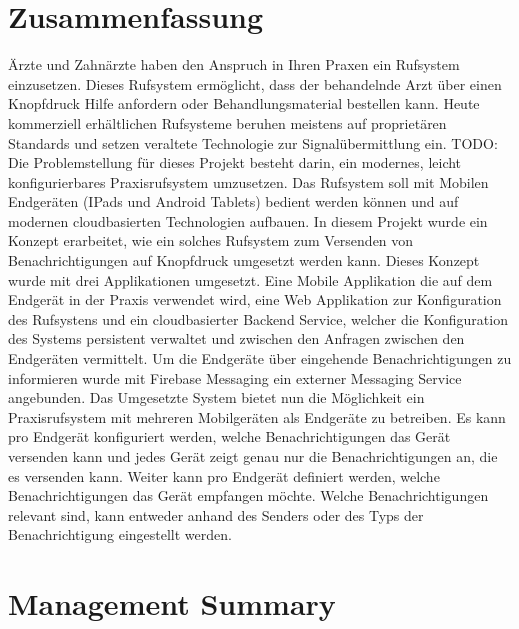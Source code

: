 \section*{Zusammenfassung}

Ärzte und Zahnärzte haben den Anspruch in Ihren Praxen ein Rufsystem einzusetzen.
Dieses Rufsystem ermöglicht, dass der behandelnde Arzt über einen Knopfdruck Hilfe anfordern oder Behandlungsmaterial bestellen kann.
Heute kommerziell erhältlichen Rufsysteme beruhen meistens auf proprietären Standards und setzen veraltete Technologie zur Signalübermittlung ein. TODO: \cite{TODO}
Die Problemstellung für dieses Projekt besteht darin, ein modernes, leicht konfigurierbares Praxisrufsystem umzusetzen.
Das Rufsystem soll mit Mobilen Endgeräten (IPads und Android Tablets) bedient werden können und auf modernen cloudbasierten Technologien aufbauen.
In diesem Projekt wurde ein Konzept erarbeitet, wie ein solches Rufsystem zum Versenden von Benachrichtigungen auf Knopfdruck umgesetzt werden kann.
Dieses Konzept wurde mit drei Applikationen umgesetzt.
Eine Mobile Applikation die auf dem Endgerät in der Praxis verwendet wird, eine Web Applikation zur Konfiguration des Rufsystens
und ein cloudbasierter Backend Service, welcher die Konfiguration des Systems persistent verwaltet und zwischen den Anfragen zwischen den Endgeräten vermittelt.
Um die Endgeräte über eingehende Benachrichtigungen zu informieren wurde mit Firebase Messaging ein externer Messaging Service angebunden.
Das Umgesetzte System bietet nun die Möglichkeit ein Praxisrufsystem mit mehreren Mobilgeräten als Endgeräte zu betreiben.
Es kann pro Endgerät konfiguriert werden, welche Benachrichtigungen das Gerät versenden kann und jedes Gerät zeigt genau nur die Benachrichtigungen an, die es versenden kann.
Weiter kann pro Endgerät definiert werden, welche Benachrichtigungen das Gerät empfangen möchte.
Welche Benachrichtigungen relevant sind, kann entweder anhand des Senders oder des Typs der Benachrichtigung eingestellt werden.



\clearpage
\section*{Management Summary}

\clearpage
